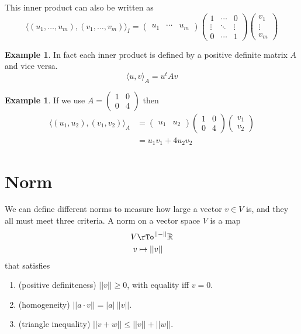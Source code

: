 \documentclass[12pt]{amsart}
\theoremstyle{definition}
\newtheorem{example}[theorem]{Example}
\begin{document}
This inner product can also be written as
$$\langle (u_1, \dots , u_m), (v_1, \dots , v_m ) \rangle_I = \left( \begin{array}{ccc} u_1 & \cdots & u_m \end{array} \right) \left( \begin{array}{ccc} 1 & \cdots & 0 \\ \vdots & \ddots & \vdots \\ 0 & \cdots & 1 \end{array} \right) \left( \begin{array}{c} v_1 \\ \vdots \\ v_m \end{array} \right)$$
\vspace{30pt}

\begin{example} \label{A_inner_product} In fact each inner product is defined by a positive definite matrix $A$ and vice versa.
$$\langle u, v \rangle_A = u^t A v$$
\end{example}
\vspace{30pt}

\begin{example} \label{J_inner_product} If we use $A = \left( \begin{array}{cc} 1 & 0 \\ 0 & 4 \end{array} \right)$ then
\begin{align*}
\langle (u_1, u_2), (v_1, v_2) \rangle_A & = \left( \begin{array}{cc} u_1 & u_2 \end{array} \right) \left( \begin{array}{cc} 1 & 0 \\ 0 & 4 \end{array} \right) \left( \begin{array}{c} v_1 \\ v_2 \end{array} \right) \\
 & = u_1 v_1 + 4 u_2 v_2
\end{align*}
\end{example}
\vfill
\pagebreak

\section{Norm} We can define different norms to measure how large a vector $v \in V$ is, and they all must meet three criteria.
\dfn A norm on a vector space $V$ is a map
\begin{align*}
V & \rTo^{|| - ||} \mathbb{R} \\
v & \mapsto ||v||
\end{align*}
that satisfies
\begin{enumerate}[\indent 1.]
\item (positive definiteness) $||v|| \geq 0$, with equality iff $v = 0$.
\item (homogeneity) $|| a \cdot v || = |a| \, || v ||$.
\item (triangle inequality) $|| v + w || \leq ||v|| + ||w||$.
\end{enumerate}
\end{document}
